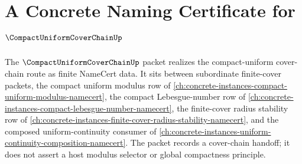 \chapter{A Concrete Naming Certificate for $\CompactUniformCoverChainUp$}
\label{ch:concrete-instances-compact-uniform-cover-chain-namecert}

The $\CompactUniformCoverChainUp$ packet realizes the compact-uniform cover-chain route as finite NameCert data. It sits between subordinate finite-cover packets, the compact uniform modulus row of \autoref{ch:concrete-instances-compact-uniform-modulus-namecert}, the compact Lebesgue-number row of \autoref{ch:concrete-instances-compact-lebesgue-number-namecert}, the finite-cover radius stability row of \autoref{ch:concrete-instances-finite-cover-radius-stability-namecert}, and the composed uniform-continuity consumer of \autoref{ch:concrete-instances-uniform-continuity-composition-namecert}. The packet records a cover-chain handoff; it does not assert a host modulus selector or global compactness principle.



